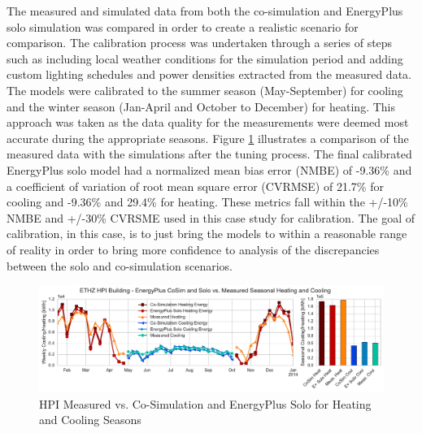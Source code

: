 \documentclass{tBPS2e}
\theoremstyle{plain}
\theoremstyle{definition}
\theoremstyle{remark}
\newcommand{\noteDT}[1]{\footnote{\textcolor{green}{#1}}}
\begin{document}
The measured and simulated data from both the co-simulation and EnergyPlus
solo simulation was compared in order to create a realistic scenario for
comparison. The calibration process was undertaken through a series of steps
such as including local weather conditions for the simulation period and
adding custom lighting schedules and power densities extracted from the
measured data. The models were calibrated to the summer season (May-September)
for cooling and the winter season (Jan-April and October to December) for
heating. This approach was taken as the data quality for the measurements were
deemed most accurate during the appropriate seasons. Figure
\ref{fig:hpi_measvssim} illustrates a comparison of the measured data with the
simulations after the tuning process. The final calibrated EnergyPlus solo
model had a normalized mean bias error (NMBE) of -9.36\% and a coefficient of
variation of root mean square error (CVRMSE) of 21.7\% for cooling and -9.36\%
and 29.4\% for heating. These metrics fall within the +/-10\% NMBE and +/-30\%
CVRSME used in this case study for calibration. The
goal of calibration, in this case, is to just bring the models to within a
reasonable range of reality in order to bring more confidence to analysis of
the discrepancies between the solo and co-simulation
scenarios.

\begin{figure}[H]
\centering
\includegraphics[scale=0.55]{figures/HPI_MeasvsSim}
\caption{HPI Measured vs. Co-Simulation and EnergyPlus Solo for Heating and Cooling Seasons}
\label{fig:hpi_measvssim}
\end{figure}
\end{document}
